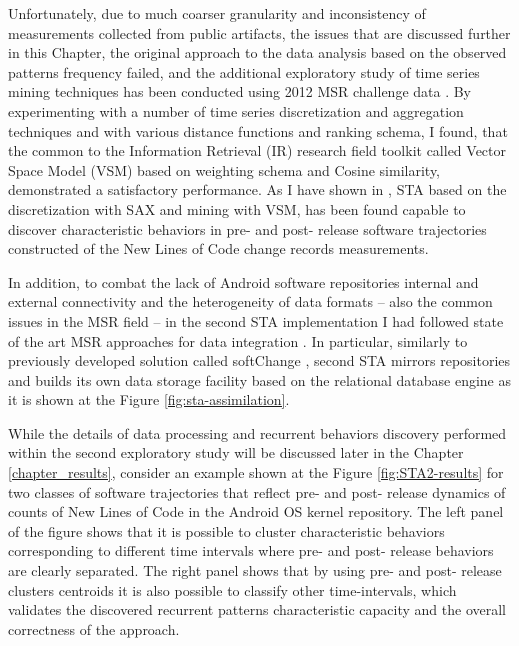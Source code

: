 Unfortunately, due to much coarser granularity and inconsistency of measurements collected from public artifacts, 
the issues that are discussed further in this Chapter, the original approach to the data analysis based on the observed patterns 
frequency failed, and the additional exploratory study of time series mining techniques has been conducted using 
2012 MSR challenge data \cite{MSRChallenge2012}.
By experimenting with a number of time series discretization and aggregation techniques and with various distance 
functions and ranking schema, I found, that the common to the Information Retrieval (IR) research field toolkit called 
Vector Space Model (VSM) based on \tfidf weighting schema and Cosine similarity, demonstrated a satisfactory performance. 
As I have shown in \cite{csdl2-11-10}, STA based on the discretization with SAX and mining with VSM, has been found capable 
to discover characteristic behaviors in pre- and post- release software trajectories constructed of the New Lines of Code 
change records measurements.

In addition, to combat the lack of Android software repositories internal and external connectivity and the heterogeneity 
of data formats -- also the common issues in the MSR field -- in the second STA implementation I had followed state of the art 
MSR approaches for data integration \cite{citeulike:13058334} \cite{cvsanaly}. 
In particular, similarly to previously developed solution called softChange \cite{german04_softchange}, second STA mirrors 
repositories and builds its own data storage facility based on the relational database engine 
as it is shown at the Figure \ref{fig:sta-assimilation}.

While the details of data processing and recurrent behaviors discovery performed within the second exploratory study will be 
discussed later in the Chapter \ref{chapter_results}, consider an example shown at the Figure \ref{fig:STA2-results} 
for two classes of software trajectories that reflect pre- and post- release dynamics of counts of New Lines of Code in 
the Android OS kernel repository. 
The left panel of the figure shows that it is possible to cluster characteristic behaviors corresponding to different time intervals 
where pre- and post- release behaviors are clearly separated. 
The right panel shows that by using pre- and post- release clusters centroids it is also possible to classify other time-intervals, 
which validates the discovered recurrent patterns characteristic capacity and the overall correctness of the approach.

